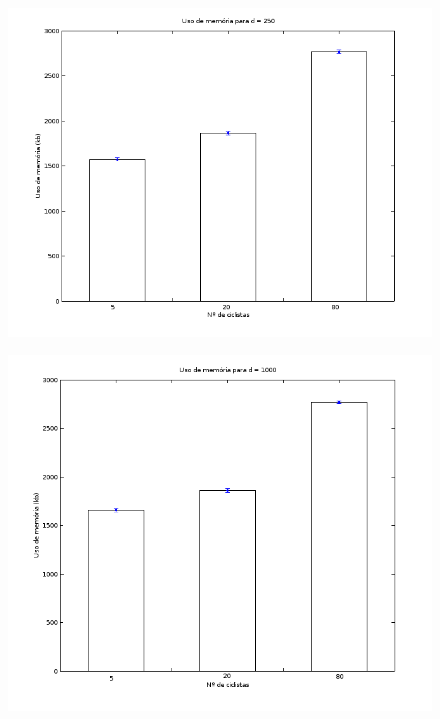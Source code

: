 \documentclass{beamer}
\begin{document}
\begin{frame}
	\begin{figure}[!h]
		\centering
		\includegraphics[scale=0.4]{1.png}
	\end{figure}
\end{frame}

\begin{frame}
	\begin{figure}[!h]
		\centering
		\includegraphics[scale=0.4]{2.png}
	\end{figure}
\end{frame}
\end{document}
